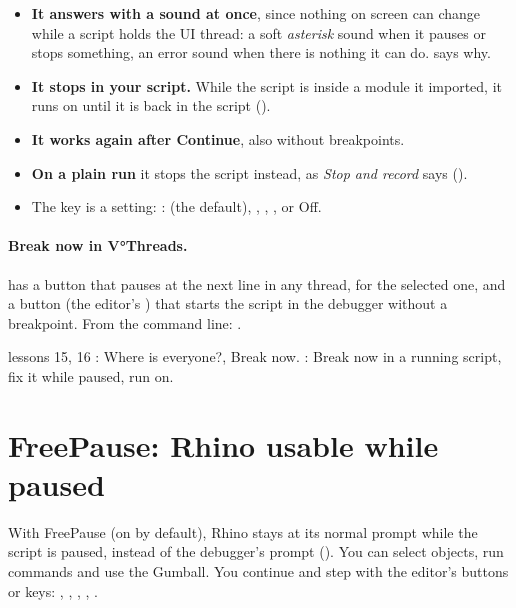 \begin{itemize}
  \item \textbf{It answers with a sound at once}, since nothing on screen can change while a script holds the
        UI thread: a soft \emph{asterisk} sound when it pauses or stops something, an error sound when there
        is nothing it can do.  says why.
  \item \textbf{It stops in your script.} While the script is inside a module it imported, it runs on until it
        is back in the script ().
  \item \textbf{It works again after Continue}, also without breakpoints.
  \item \textbf{On a plain run} it stops the script instead, as \emph{Stop and record} says
        ().
  \item The key is a setting: :  (the default), ,
        , , or Off.
\end{itemize}

\paragraph{Break now in V°Threads.}  has a  button that pauses at the next line in any
thread,  for the selected one, and a  button (the editor's ) that starts the script in the
debugger without a breakpoint. From the command line: .

\begin{lesson}{lessons 15, 16}
: Where is everyone?, Break now. : Break now in a
running script, fix it while paused, run on.
\end{lesson}

\section{FreePause: Rhino usable while paused}\label{sec:freepause}

With FreePause (on by default), Rhino stays at its normal  prompt while the script is paused,
instead of the debugger's  prompt (). You can select objects, run commands
and use the Gumball. You continue and step with the editor's buttons or keys: , ,
, , .

